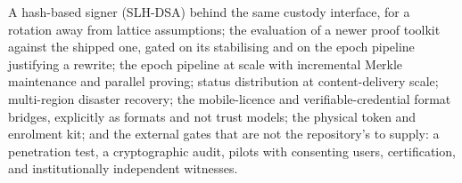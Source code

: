 A hash-based signer (SLH-DSA) behind the same custody interface, for a rotation away from lattice
assumptions; the evaluation of a newer proof toolkit against the shipped one, gated on its
stabilising and on the epoch pipeline justifying a rewrite; the epoch pipeline at scale with
incremental Merkle maintenance and parallel proving; status distribution at content-delivery scale;
multi-region disaster recovery; the mobile-licence and verifiable-credential
format bridges, explicitly as formats and not trust models; the physical token and enrolment kit;
and the external gates that are not the repository's to supply: a penetration test, a cryptographic
audit, pilots with consenting users, certification, and institutionally independent witnesses.
